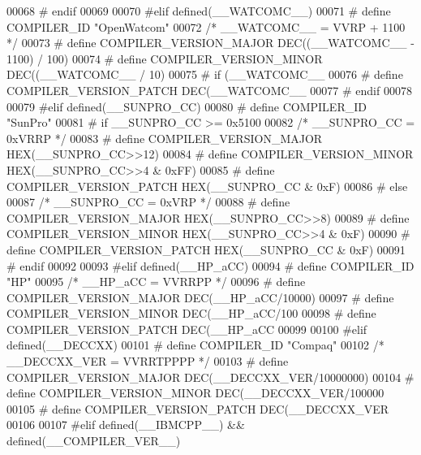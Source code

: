 \begin{DoxyCode}
{{{{{{{00068 \textcolor{preprocessor}{# endif}
00069 
00070 \textcolor{preprocessor}{#elif defined(\_\_WATCOMC\_\_)}
00071 \textcolor{preprocessor}{# define COMPILER\_ID "OpenWatcom"}
00072    \textcolor{comment}{/* \_\_WATCOMC\_\_ = VVRP + 1100 */}
00073 \textcolor{preprocessor}{# define COMPILER\_VERSION\_MAJOR DEC((\_\_WATCOMC\_\_ - 1100) / 100)}
00074 \textcolor{preprocessor}{# define COMPILER\_VERSION\_MINOR DEC((\_\_WATCOMC\_\_ / 10) %
00075 \textcolor{preprocessor}{# if (\_\_WATCOMC\_\_ %
00076 \textcolor{preprocessor}{#  define COMPILER\_VERSION\_PATCH DEC(\_\_WATCOMC\_\_ %
00077 \textcolor{preprocessor}{# endif}
00078 
00079 \textcolor{preprocessor}{#elif defined(\_\_SUNPRO\_CC)}
00080 \textcolor{preprocessor}{# define COMPILER\_ID "SunPro"}
00081 \textcolor{preprocessor}{# if \_\_SUNPRO\_CC >= 0x5100}
00082    \textcolor{comment}{/* \_\_SUNPRO\_CC = 0xVRRP */}
00083 \textcolor{preprocessor}{#  define COMPILER\_VERSION\_MAJOR HEX(\_\_SUNPRO\_CC>>12)}
00084 \textcolor{preprocessor}{#  define COMPILER\_VERSION\_MINOR HEX(\_\_SUNPRO\_CC>>4 & 0xFF)}
00085 \textcolor{preprocessor}{#  define COMPILER\_VERSION\_PATCH HEX(\_\_SUNPRO\_CC    & 0xF)}
00086 \textcolor{preprocessor}{# else}
00087    \textcolor{comment}{/* \_\_SUNPRO\_CC = 0xVRP */}
00088 \textcolor{preprocessor}{#  define COMPILER\_VERSION\_MAJOR HEX(\_\_SUNPRO\_CC>>8)}
00089 \textcolor{preprocessor}{#  define COMPILER\_VERSION\_MINOR HEX(\_\_SUNPRO\_CC>>4 & 0xF)}
00090 \textcolor{preprocessor}{#  define COMPILER\_VERSION\_PATCH HEX(\_\_SUNPRO\_CC    & 0xF)}
00091 \textcolor{preprocessor}{# endif}
00092 
00093 \textcolor{preprocessor}{#elif defined(\_\_HP\_aCC)}
00094 \textcolor{preprocessor}{# define COMPILER\_ID "HP"}
00095   \textcolor{comment}{/* \_\_HP\_aCC = VVRRPP */}
00096 \textcolor{preprocessor}{# define COMPILER\_VERSION\_MAJOR DEC(\_\_HP\_aCC/10000)}
00097 \textcolor{preprocessor}{# define COMPILER\_VERSION\_MINOR DEC(\_\_HP\_aCC/100 %
00098 \textcolor{preprocessor}{# define COMPILER\_VERSION\_PATCH DEC(\_\_HP\_aCC     %
00099 
00100 \textcolor{preprocessor}{#elif defined(\_\_DECCXX)}
00101 \textcolor{preprocessor}{# define COMPILER\_ID "Compaq"}
00102   \textcolor{comment}{/* \_\_DECCXX\_VER = VVRRTPPPP */}
00103 \textcolor{preprocessor}{# define COMPILER\_VERSION\_MAJOR DEC(\_\_DECCXX\_VER/10000000)}
00104 \textcolor{preprocessor}{# define COMPILER\_VERSION\_MINOR DEC(\_\_DECCXX\_VER/100000  %
00105 \textcolor{preprocessor}{# define COMPILER\_VERSION\_PATCH DEC(\_\_DECCXX\_VER         %
00106 
00107 \textcolor{preprocessor}{#elif defined(\_\_IBMCPP\_\_) && defined(\_\_COMPILER\_VER\_\_)}
}}}}}}}}}}}}}}
\end{DoxyCode}
